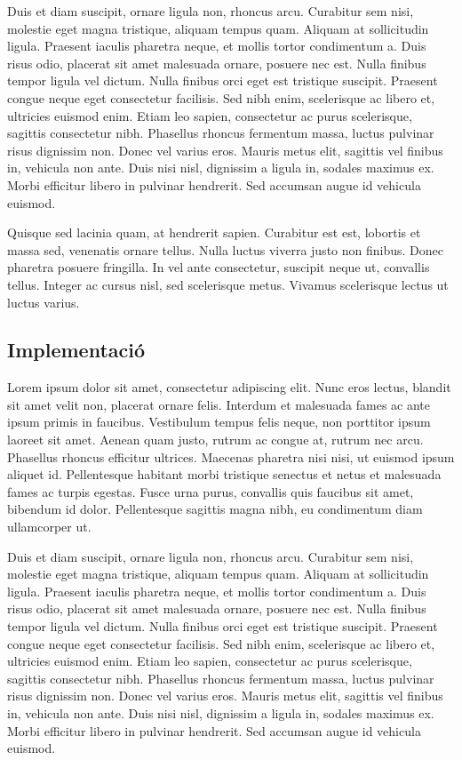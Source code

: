 \documentclass[11pt,a4paper]{article}
\begin{document}
Duis et diam suscipit, ornare ligula non, rhoncus arcu. Curabitur sem nisi, molestie eget magna tristique, aliquam tempus quam. Aliquam at sollicitudin ligula. Praesent iaculis pharetra neque, et mollis tortor condimentum a. Duis risus odio, placerat sit amet malesuada ornare, posuere nec est. Nulla finibus tempor ligula vel dictum. Nulla finibus orci eget est tristique suscipit. Praesent congue neque eget consectetur facilisis. Sed nibh enim, scelerisque ac libero et, ultricies euismod enim. Etiam leo sapien, consectetur ac purus scelerisque, sagittis consectetur nibh. Phasellus rhoncus fermentum massa, luctus pulvinar risus dignissim non. Donec vel varius eros. Mauris metus elit, sagittis vel finibus in, vehicula non ante. Duis nisi nisl, dignissim a ligula in, sodales maximus ex. Morbi efficitur libero in pulvinar hendrerit. Sed accumsan augue id vehicula euismod.

Quisque sed lacinia quam, at hendrerit sapien. Curabitur est est, lobortis et massa sed, venenatis ornare tellus. Nulla luctus viverra justo non finibus. Donec pharetra posuere fringilla. In vel ante consectetur, suscipit neque ut, convallis tellus. Integer ac cursus nisl, sed scelerisque metus. Vivamus scelerisque lectus ut luctus varius.
\subsection{Implementació}
Lorem ipsum dolor sit amet, consectetur adipiscing elit. Nunc eros lectus, blandit sit amet velit non, placerat ornare felis. Interdum et malesuada fames ac ante ipsum primis in faucibus. Vestibulum tempus felis neque, non porttitor ipsum laoreet sit amet. Aenean quam justo, rutrum ac congue at, rutrum nec arcu. Phasellus rhoncus efficitur ultrices. Maecenas pharetra nisi nisi, ut euismod ipsum aliquet id. Pellentesque habitant morbi tristique senectus et netus et malesuada fames ac turpis egestas. Fusce urna purus, convallis quis faucibus sit amet, bibendum id dolor. Pellentesque sagittis magna nibh, eu condimentum diam ullamcorper ut.

Duis et diam suscipit, ornare ligula non, rhoncus arcu. Curabitur sem nisi, molestie eget magna tristique, aliquam tempus quam. Aliquam at sollicitudin ligula. Praesent iaculis pharetra neque, et mollis tortor condimentum a. Duis risus odio, placerat sit amet malesuada ornare, posuere nec est. Nulla finibus tempor ligula vel dictum. Nulla finibus orci eget est tristique suscipit. Praesent congue neque eget consectetur facilisis. Sed nibh enim, scelerisque ac libero et, ultricies euismod enim. Etiam leo sapien, consectetur ac purus scelerisque, sagittis consectetur nibh. Phasellus rhoncus fermentum massa, luctus pulvinar risus dignissim non. Donec vel varius eros. Mauris metus elit, sagittis vel finibus in, vehicula non ante. Duis nisi nisl, dignissim a ligula in, sodales maximus ex. Morbi efficitur libero in pulvinar hendrerit. Sed accumsan augue id vehicula euismod.
\end{document}
